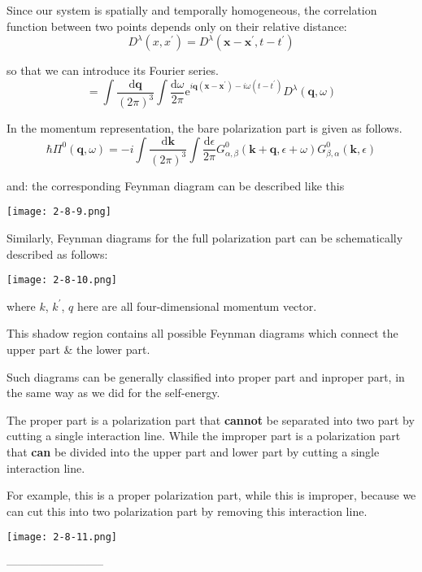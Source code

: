 Since our system is spatially and temporally homogeneous, the correlation function between two points depends only on their relative distance:
\[D^{\lambda}(x,x^{'}) = D^{\lambda}(\mathbf{x}-\mathbf{x}^{'},t-t^{'})\]

so that we can introduce its Fourier series.
\[=\int \frac{\mathrm{d}\mathbf{q}}{(2\pi)^3}\int \frac{\mathrm{d} \omega}{2\pi} \mathrm{e}^{i \mathbf{q}(\mathbf{x}-\mathbf{x}^{'})-i \omega(t-t^{'})}D^{\lambda}(\mathbf{q},\omega)\]

In the momentum representation, the bare polarization part is given as follows.
\[ \hbar \Pi^0(\mathbf{q},\omega) = -i \int \frac{\mathrm{d}\mathbf{k}}{(2\pi)^3} \int \frac{\mathrm{d}\epsilon}{2\pi} G^0_{\alpha,\beta}(\mathbf{k}+\mathbf{q},\epsilon+\omega)G^0_{\beta,\alpha}(\mathbf{k},\epsilon) \]

and: the corresponding Feynman diagram can be described like this
\begin{center} \label{Fig2.8.9}
\texttt{[image: 2-8-9.png]}
\end{center}

Similarly, Feynman diagrams for the full polarization part can be schematically described as follows:
\begin{center} \label{Fig2.8.10}
\texttt{[image: 2-8-10.png]}
\end{center}

where $k$, $k^{'}$, $q$ here are all four-dimensional momentum vector.

This shadow region contains all possible Feynman diagrams which connect the upper part \& the lower part.

Such diagrams can be generally classified into proper part and inproper part, in the same way as we did for the self-energy.

The proper part is a polarization part that \textbf{cannot} be separated into two part by cutting a single interaction line. While the improper part is a polarization part that \textbf{can} be divided into the upper part and lower part by cutting a single interaction line.

For example, this is a proper polarization part, while this is improper, because we can cut this into two polarization part by removing this interaction line.
\begin{center} \label{Fig2.8.11}
\texttt{[image: 2-8-11.png]}
\end{center}

\begin{center}--------------------------\end{center}

